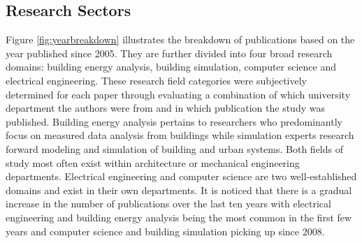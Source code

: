 \subsection{Research Sectors}
\label{sec:subsectors}

Figure \ref{fig:yearbreakdown} illustrates the breakdown of publications based on the year published since 2005. They are further divided into four broad research domains: building energy analysis, building simulation, computer science and electrical engineering. These research field categories were subjectively determined for each paper through evaluating a combination of which university department the authors were from and in which publication the study was published. Building energy analysis pertains to researchers who predominantly focus on measured data analysis from buildings while simulation experts research forward modeling and simulation of building and urban systems. Both fields of study most often exist within architecture or mechanical engineering departments. Electrical engineering and computer science are two well-established domains and exist in their own departments. It is noticed that there is a gradual increase in the number of publications over the last ten years with electrical engineering and building energy analysis being the most common in the first few years and computer science and building simulation picking up since 2008. 